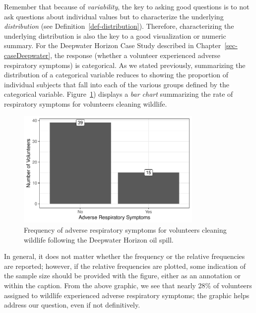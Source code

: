 \documentclass[
  letterpaper,
  DIV=11,
  numbers=noendperiod]{scrreprt}
\theoremstyle{plain}
\theoremstyle{definition}
\theoremstyle{definition}
\theoremstyle{remark}
\begin{document}
Remember that because of \emph{variability}, the key to asking good
questions is to not ask questions about individual values but to
characterize the underlying \emph{distribution} (see
Definition~\ref{def-distribution}). Therefore, characterizing the
underlying distribution is also the key to a good visualization or
numeric summary. For the Deepwater Horizon Case Study described in
Chapter~\ref{sec-caseDeepwater}, the response (whether a volunteer
experienced adverse respiratory symptoms) is categorical. As we stated
previously, summarizing the distribution of a categorical variable
reduces to showing the proportion of individual subjects that fall into
each of the various groups defined by the categorical variable.
Figure~\ref{fig-summaries-deepwater-barchart}) displays a \emph{bar
chart} summarizing the rate of respiratory symptoms for volunteers
cleaning wildlife.

\begin{figure}

{\centering \includegraphics[width=0.8\textwidth,height=\textheight]{./images/fig-summaries-deepwater-barchart-1.pdf}

}

\caption{\label{fig-summaries-deepwater-barchart}Frequency of adverse
respiratory symptoms for volunteers cleaning wildlife following the
Deepwater Horizon oil spill.}

\end{figure}

In general, it does not matter whether the frequency or the relative
frequencies are reported; however, if the relative frequencies are
plotted, some indication of the sample size should be provided with the
figure, either as an annotation or within the caption. From the above
graphic, we see that nearly 28\% of volunteers assigned to wildlife
experienced adverse respiratory symptoms; the graphic helps address our
question, even if not definitively.
\end{document}

